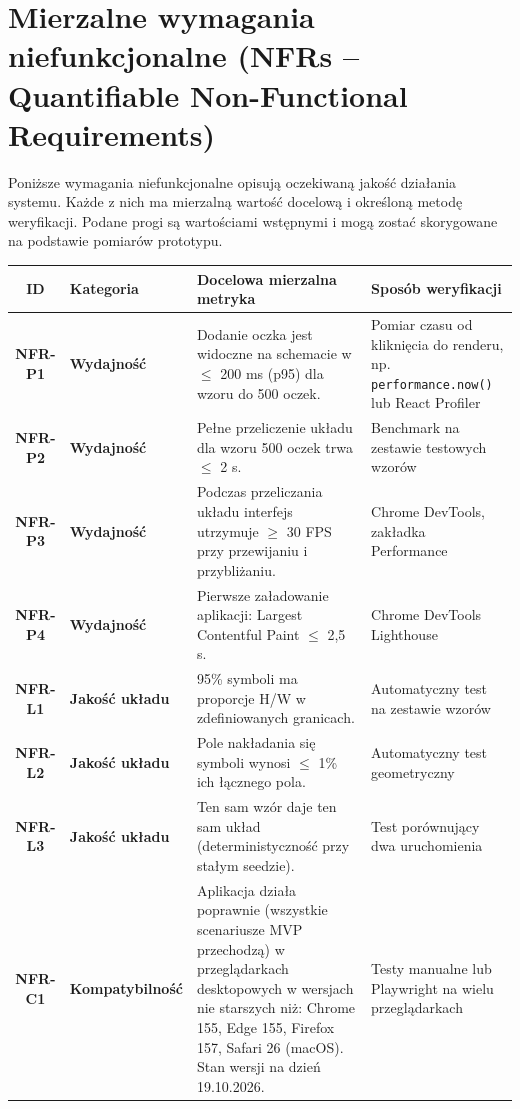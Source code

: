 \documentclass[a4paper,11pt]{article}
\begin{document}
\pagebreak

\section{Mierzalne wymagania niefunkcjonalne (NFRs -- Quantifiable Non-Functional Requirements)}

Poniższe wymagania niefunkcjonalne opisują oczekiwaną jakość działania systemu. Każde z nich ma mierzalną wartość docelową i określoną metodę weryfikacji. Podane progi są wartościami wstępnymi i mogą zostać skorygowane na podstawie pomiarów prototypu.

\begin{xltabular}{0.95\textwidth}{|c|l|X|X|}  
  \hline
  \textbf{ID} & \textbf{Kategoria} & \textbf{Docelowa mierzalna metryka} & \textbf{Sposób weryfikacji} \\
  \hline
  \textbf{NFR-P1} & \textbf{Wydajność} & Dodanie oczka jest widoczne na schemacie w $\leq$ 200 ms (p95) dla wzoru do 500 oczek. & Pomiar czasu od kliknięcia do renderu, np. \texttt{performance.now()} lub React Profiler \\
  \hline
  \textbf{NFR-P2} & \textbf{Wydajność} & Pełne przeliczenie układu dla wzoru 500 oczek trwa $\leq$ 2 s. & Benchmark na zestawie testowych wzorów \\
  \hline
  \textbf{NFR-P3} & \textbf{Wydajność} & Podczas przeliczania układu interfejs utrzymuje $\geq$ 30 FPS przy przewijaniu i przybliżaniu. & Chrome DevTools, zakładka Performance \\
  \hline
  \textbf{NFR-P4} & \textbf{Wydajność} & Pierwsze załadowanie aplikacji: Largest Contentful Paint $\leq$ 2,5 s. & Chrome DevTools Lighthouse \\
  \hline
  \textbf{NFR-L1} & \textbf{Jakość układu} & 95\% symboli ma proporcje H/W w zdefiniowanych granicach. & Automatyczny test na zestawie wzorów \\
  \hline
  \textbf{NFR-L2} & \textbf{Jakość układu} & Pole nakładania się symboli wynosi $\leq$ 1\% ich łącznego pola. & Automatyczny test geometryczny \\
  \hline
  \textbf{NFR-L3} & \textbf{Jakość układu} & Ten sam wzór daje ten sam układ (deterministyczność przy stałym seedzie). & Test porównujący dwa uruchomienia \\
  \hline
  \textbf{NFR-C1} & \textbf{Kompatybilność} & Aplikacja działa poprawnie (wszystkie scenariusze MVP przechodzą) w przeglądarkach desktopowych w wersjach nie starszych niż: Chrome 155, Edge 155, Firefox 157, Safari 26 (macOS). Stan wersji na dzień 19.10.2026. & Testy manualne lub Playwright na wielu przeglądarkach \\

\end{xltabular}
\end{document}
